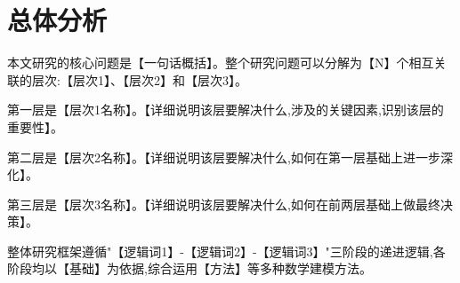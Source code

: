 
\section{总体分析}

本文研究的核心问题是【一句话概括】。整个研究问题可以分解为【N】个相互关联的层次:【层次1】、【层次2】和【层次3】。

第一层是【层次1名称】。【详细说明该层要解决什么,涉及的关键因素,识别该层的重要性】。

第二层是【层次2名称】。【详细说明该层要解决什么,如何在第一层基础上进一步深化】。

第三层是【层次3名称】。【详细说明该层要解决什么,如何在前两层基础上做最终决策】。

整体研究框架遵循"【逻辑词1】-【逻辑词2】-【逻辑词3】"三阶段的递进逻辑,各阶段均以【基础】为依据,综合运用【方法】等多种数学建模方法。
